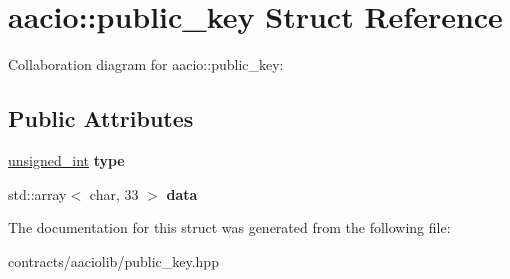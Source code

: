 \hypertarget{structaacio_1_1public__key}{}\section{aacio\+:\+:public\+\_\+key Struct Reference}
\label{structaacio_1_1public__key}


Collaboration diagram for aacio\+:\+:public\+\_\+key\+:
\subsection*{Public Attributes}
\begin{DoxyCompactItemize}
\item 
\mbox{\label{structaacio_1_1public__key_a34a03b830471d45b6cef73edbda67fcf}} 
\mbox{\hyperlink{structfc_1_1unsigned__int}{unsigned\+\_\+int}} {\bfseries type}
\item 
\mbox{\label{structaacio_1_1public__key_a82deb1fe1cb153cb1d836f3194894e34}} 
std\+::array$<$ char, 33 $>$ {\bfseries data}
\end{DoxyCompactItemize}


The documentation for this struct was generated from the following file\+:\begin{DoxyCompactItemize}
\item 
contracts/aaciolib/public\+\_\+key.\+hpp\end{DoxyCompactItemize}
